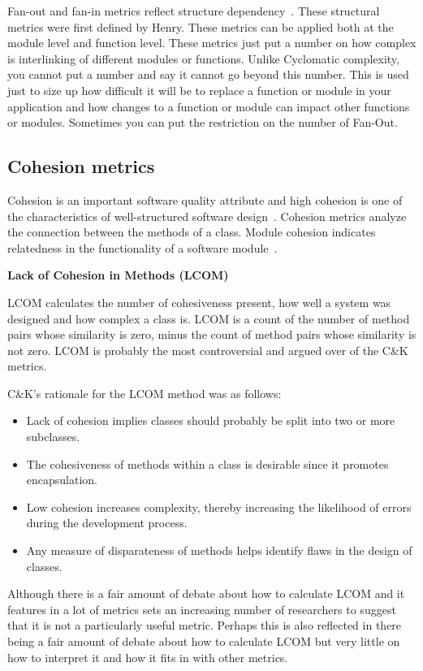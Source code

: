 Fan-out and fan-in metrics reflect structure dependency~\cite{fanin}.
These structural metrics were first defined by Henry.
These metrics can be applied both at the module level and function level. These metrics just put a number on how complex is interlinking of different modules or functions. Unlike Cyclomatic complexity, you cannot put a number and say it cannot go beyond this number. This is used just to size up how difficult it will be to replace a function or module in your application and how changes to a function or module can impact other functions or modules. Sometimes you can put the restriction on the number of Fan-Out.


\subsection{Cohesion metrics}
Cohesion is an important software quality attribute and high cohesion is one of the characteristics of well-structured software design~\cite{cohesion}.
Cohesion metrics analyze the connection between the methods of a class.
Module cohesion indicates relatedness in the functionality of a software module~\cite{cohesion2}.

\textbf{Lack of Cohesion in Methods (LCOM)}

LCOM calculates the number of cohesiveness present, how well a system was designed and how complex a class is. LCOM is a count of the number of method pairs whose similarity is zero, minus the count of method pairs whose similarity is not zero. LCOM is probably the most controversial and argued over of the C\&K metrics.

C\&K's rationale for the LCOM method was as follows:
\begin{itemize}
	\item Lack of cohesion implies classes should probably be split into two or more subclasses.
	\item The cohesiveness of methods within a class is desirable since it promotes encapsulation.
	\item Low cohesion increases complexity, thereby increasing the likelihood of errors during the development process.
	\item Any measure of disparateness of methods helps identify flaws in the design of classes. 
\end{itemize}

Although there is a fair amount of debate about how to calculate LCOM and it features in a lot of metrics sets an increasing number of researchers to suggest that it is not a particularly useful metric. Perhaps this is also reflected in there being a fair amount of debate about how to calculate LCOM but very little on how to interpret it and how it fits in with other metrics. 

